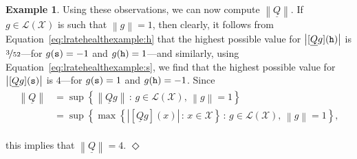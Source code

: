 \documentclass[10pt,a4paper]{paper}
\theoremstyle{definition}
\newtheorem{exmp}{Example}%
\newcommand{\states}{\mathcal{X}}
\newcommand{\gambles}{\mathcal{L}}
\newcommand{\gamblesX}{\gambles(\states)}
\newcommand{\rateset}{\mathcal{Q}}
\newcommand{\lrate}{\underline{Q}}
\newcommand{\norm}[1]{\left\lVert #1 \right\rVert}
\newcommand{\abs}[1]{\left\vert #1 \right\vert}
\newcommand{\exampleend}{\hfill$\Diamond$}
\begin{document}
\begin{exmp}

Using these observations, we can now compute $\norm{\lrate}$. If $g\in\gamblesX$ is such that $\norm{g}=1$, then clearly, it follows from Equation~\eqref{eq:lratehealthexample:h} that the highest possible value for $\abs{[\lrate g]({\tt h})}$ is $\nicefrac{3}{52}$---for $g({\tt s})=-1$ and $g({\tt h})=1$---and similarly, using Equation~\eqref{eq:lratehealthexample:s}, we find that the highest possible value for $\abs{[\lrate g]({\tt s})}$ is $4$---for $g({\tt s})=1$ and $g({\tt h})=-1$. Since
\vspace{-2pt}
\begin{align*}
\norm{\lrate} &= \sup\left\{ \norm{\lrate g}\,:\,g\in\gamblesX,\, \norm{g}=1 \right\} \\
 &= \sup\left\{ \max\left\{\abs{\left[\lrate g\right](x)}\,:\,x\in\states\right\}\,:\,g\in\gamblesX,\, \norm{g}=1 \right\},
\end{align*}\\[-4pt]
this implies that $\norm{\lrate}=4$.
\exampleend
\end{exmp}
\end{document}
